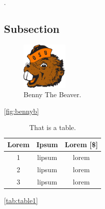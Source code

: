 
\lipsum[2-4] \cite{benny_history}. 

\subsection{Subsection}
\lipsum[5]

\begin{figure}[H]
    \centering
    \includegraphics[width = 0.2\textwidth ]{figures/tex.png}
    \caption{Benny The Beaver. \cite{benny_history}}
    \label{fig:bennyb}
\end{figure}

\lipsum[6-7] \autoref{fig:bennyb}

\begin{table}[H]
    \centering
    \caption{That is a table.}
    \begin{tabular}{|c|c|c|}
    \centering
    \textbf{Lorem} & \textbf{Ipsum} & \textbf{Lorem [\$]} \\ \hline \hline
1   & lipsum    & lorem     \\ \hline   
2   & lipsum    & lorem   \\ \hline
3   & lipsum    & lorem  
    \end{tabular}
    \label{tab:table1}
\end{table}

\lipsum[8]
\autoref{tab:table1}